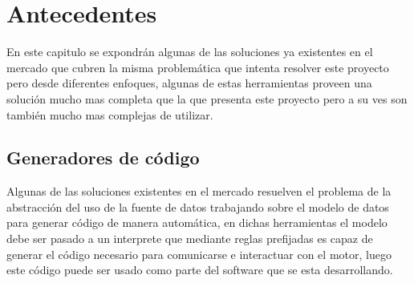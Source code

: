 \chapter{Antecedentes}
En este capitulo se expondrán algunas de las soluciones ya existentes en el mercado que cubren la misma problemática que intenta resolver este proyecto pero desde diferentes enfoques, algunas de estas herramientas proveen una solución mucho mas completa que la que presenta este proyecto pero a su ves son también mucho mas complejas de utilizar.
%
%
\section{Generadores de código}
Algunas de las soluciones existentes en el mercado resuelven el problema de la abstracción del uso de la fuente de datos trabajando sobre el modelo de datos para generar código de manera automática, en dichas herramientas el modelo debe ser pasado a un interprete que mediante reglas prefijadas es capaz de generar el código necesario para comunicarse e interactuar con el motor, luego este código puede ser usado como parte del software que se esta desarrollando.

